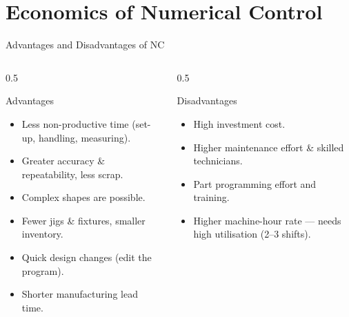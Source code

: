 \documentclass[aspectratio=169]{beamer}
\begin{document}
	\section{Economics of Numerical Control}
	\begin{frame}{Advantages and Disadvantages of NC}
		\begin{columns}[T]
			\begin{column}{0.5\textwidth}
				\begin{block}{Advantages}
					\begin{itemize}\small
						\item Less non-productive time (set-up, handling, measuring).
						\item Greater accuracy \& repeatability, less scrap.
						\item Complex shapes are possible.
						\item Fewer jigs \& fixtures, smaller inventory.
						\item Quick design changes (edit the program).
						\item Shorter manufacturing lead time.
					\end{itemize}
				\end{block}
			\end{column}
			\begin{column}{0.5\textwidth}
				\begin{block}{Disadvantages}
					\begin{itemize}\small
						\item High investment cost.
						\item Higher maintenance effort \& skilled technicians.
						\item Part programming effort and training.
						\item Higher machine-hour rate --- needs high utilisation (2--3 shifts).
					\end{itemize}
				\end{block}
			\end{column}
		\end{columns}
	\end{frame}
\end{document}
